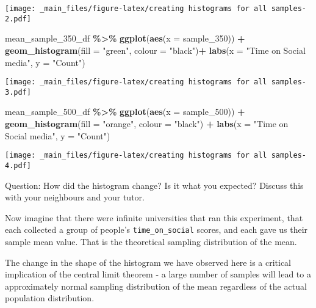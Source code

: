 \documentclass[
]{book}
\newenvironment{Shaded}{\begin{snugshade}}{\end{snugshade}}
\newcommand{\AttributeTok}[1]{\textcolor[rgb]{0.13,0.29,0.53}{#1}}
\newcommand{\FunctionTok}[1]{\textcolor[rgb]{0.13,0.29,0.53}{\textbf{#1}}}
\newcommand{\NormalTok}[1]{#1}
\newcommand{\SpecialCharTok}[1]{\textcolor[rgb]{0.81,0.36,0.00}{\textbf{#1}}}
\newcommand{\StringTok}[1]{\textcolor[rgb]{0.31,0.60,0.02}{#1}}
\begin{document}
\texttt{[image: \_main\_files/figure-latex/creating histograms for all samples-2.pdf]}

\begin{Shaded}
\begin{Highlighting}[]
\NormalTok{mean\_sample\_350\_df }\SpecialCharTok{\%\textgreater{}\%} 
\FunctionTok{ggplot}\NormalTok{(}\FunctionTok{aes}\NormalTok{(}\AttributeTok{x =}\NormalTok{ sample\_350)) }\SpecialCharTok{+}
  \FunctionTok{geom\_histogram}\NormalTok{(}\AttributeTok{fill =} \StringTok{"green"}\NormalTok{, }\AttributeTok{colour =} \StringTok{"black"}\NormalTok{)}\SpecialCharTok{+}
    \FunctionTok{labs}\NormalTok{(}\AttributeTok{x =} \StringTok{"Time on Social media"}\NormalTok{, }\AttributeTok{y =} \StringTok{"Count"}\NormalTok{)}
\end{Highlighting}
\end{Shaded}

\texttt{[image: \_main\_files/figure-latex/creating histograms for all samples-3.pdf]}

\begin{Shaded}
\begin{Highlighting}[]
\NormalTok{mean\_sample\_500\_df }\SpecialCharTok{\%\textgreater{}\%} 
\FunctionTok{ggplot}\NormalTok{(}\FunctionTok{aes}\NormalTok{(}\AttributeTok{x =}\NormalTok{ sample\_500)) }\SpecialCharTok{+}
  \FunctionTok{geom\_histogram}\NormalTok{(}\AttributeTok{fill =} \StringTok{"orange"}\NormalTok{, }\AttributeTok{colour =} \StringTok{"black"}\NormalTok{) }\SpecialCharTok{+}
    \FunctionTok{labs}\NormalTok{(}\AttributeTok{x =} \StringTok{"Time on Social media"}\NormalTok{, }\AttributeTok{y =} \StringTok{"Count"}\NormalTok{)}
\end{Highlighting}
\end{Shaded}

\texttt{[image: \_main\_files/figure-latex/creating histograms for all samples-4.pdf]}

Question: How did the histogram change? Is it what you expected? Discuss this with your neighbours and your tutor.

Now imagine that there were infinite universities that ran this experiment, that each collected a group of people's \texttt{time\_on\_social} scores, and each gave us their sample mean value. That is the theoretical sampling distribution of the mean.

The change in the shape of the histogram we have observed here is a critical implication of the central limit theorem - a large number of samples will lead to a approximately normal sampling distribution of the mean regardless of the actual population distribution.
\end{document}
